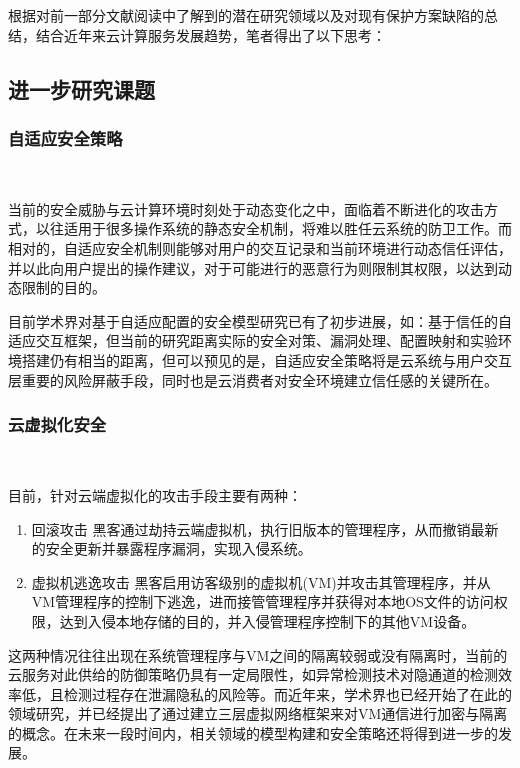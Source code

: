 \documentclass[a4paper, 12pt, conference]{ieeeconf}      %
\begin{document}
根据对前一部分文献阅读中了解到的潜在研究领域以及对现有保护方案缺陷的总结，结合近年来云计算服务发展趋势，笔者得出了以下思考：

\subsection{进一步研究课题}

\subsubsection{自适应安全策略}
\ 

当前的安全威胁与云计算环境时刻处于动态变化之中，面临着不断进化的攻击方式，以往适用于很多操作系统的静态安全机制，将难以胜任云系统的防卫工作。而相对的，自适应安全机制则能够对用户的交互记录和当前环境进行动态信任评估，并以此向用户提出的操作建议，对于可能进行的恶意行为则限制其权限，以达到动态限制的目的。

目前学术界对基于自适应配置的安全模型研究已有了初步进展，如：基于信任的自适应交互框架，但当前的研究距离实际的安全对策、漏洞处理、配置映射和实验环境搭建仍有相当的距离，但可以预见的是，自适应安全策略将是云系统与用户交互层重要的风险屏蔽手段，同时也是云消费者对安全环境建立信任感的关键所在。


\subsubsection{云虚拟化安全}
\ 

目前，针对云端虚拟化的攻击手段主要有两种：
\begin{enumerate}
	\item  回滚攻击 
	\subitem
	黑客通过劫持云端虚拟机，执行旧版本的管理程序，从而撤销最新的安全更新并暴露程序漏洞，实现入侵系统。
	
	\item 虚拟机逃逸攻击 
	\subitem 黑客启用访客级别的虚拟机(VM)并攻击其管理程序，并从VM管理程序的控制下逃逸，进而接管管理程序并获得对本地OS文件的访问权限，达到入侵本地存储的目的，并入侵管理程序控制下的其他VM设备。

\end{enumerate}


这两种情况往往出现在系统管理程序与VM之间的隔离较弱或没有隔离时，当前的云服务对此供给的防御策略仍具有一定局限性，如异常检测技术对隐通道的检测效率低，且检测过程存在泄漏隐私的风险等。而近年来，学术界也已经开始了在此的领域研究，并已经提出了通过建立三层虚拟网络框架来对VM通信进行加密与隔离的概念。在未来一段时间内，相关领域的模型构建和安全策略还将得到进一步的发展。
\end{document}
